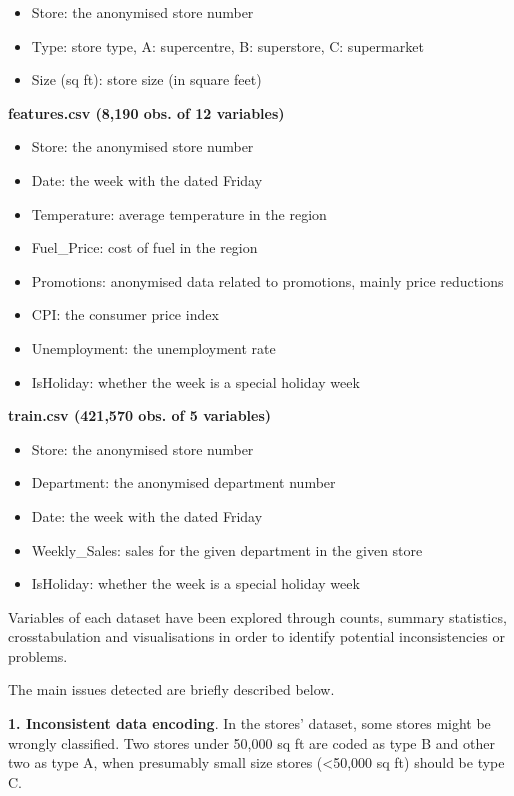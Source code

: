 \documentclass[11pt,]{article}
\providecommand{\tightlist}{%
  \setlength{\itemsep}{0pt}\setlength{\parskip}{0pt}}
\begin{document}
\begin{itemize}
\tightlist
\item
  Store: the anonymised store number 
\item
  Type: store type, A: supercentre, B: superstore, C: supermarket 
\item
  Size (sq ft): store size (in square feet) 
\end{itemize}

\textbf{features.csv (8,190 obs. of 12 variables)}

\begin{itemize}
\tightlist
\item
  Store: the anonymised store number 
\item
  Date: the week with the dated Friday 
\item
  Temperature: average temperature in the region 
\item
  Fuel\_Price: cost of fuel in the region 
\item
  Promotions: anonymised data related to promotions, mainly price
  reductions 
\item
  CPI: the consumer price index 
\item
  Unemployment: the unemployment rate 
\item
  IsHoliday: whether the week is a special holiday week 
\end{itemize}

\textbf{train.csv (421,570 obs. of 5 variables)}

\begin{itemize}
\tightlist
\item
  Store: the anonymised store number 
\item
  Department: the anonymised department number 
\item
  Date: the week with the dated Friday 
\item
  Weekly\_Sales: sales for the given department in the given store 
\item
  IsHoliday: whether the week is a special holiday week 
\end{itemize}

\pagebreak

Variables of each dataset have been explored through counts, summary
statistics, crosstabulation and visualisations in order to identify
potential inconsistencies or problems.

The main issues detected are briefly described below.

\textbf{1. Inconsistent data encoding}. In the stores' dataset, some
stores might be wrongly classified. Two stores under 50,000 sq ft are
coded as type B and other two as type A, when presumably small size
stores (\textless{}50,000 sq ft) should be type C.
\end{document}
